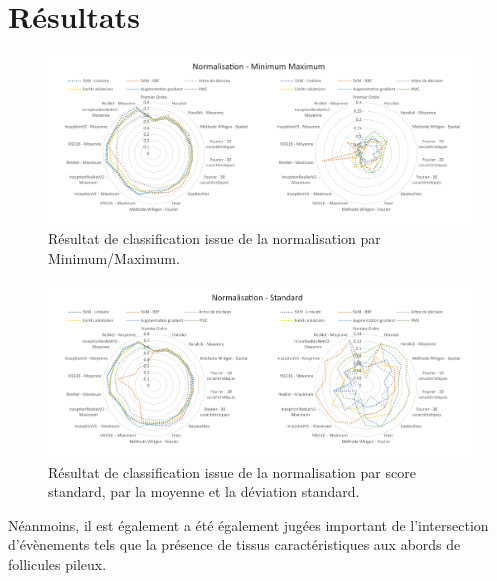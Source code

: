     

\section{Résultats}

\begin{figure}[H]
    \centering
    \includegraphics[width=\linewidth]{contents/chapter_4/resources/results_image_classification_mms.pdf}
    \caption{Résultat de classification issue de la normalisation par Minimum/Maximum.}
    \label{fig:results_image_classification_mms}
\end{figure}\par

\begin{figure}[H]
    \centering
    \includegraphics[width=\linewidth]{contents/chapter_4/resources/results_image_classification_ss.pdf}
    \caption{Résultat de classification issue de la normalisation par score standard, par la moyenne et la déviation standard.}
    \label{fig:results_image_classification_ss}
\end{figure}\par

Néanmoins, il est également a été également jugées important de l'intersection d'évènements tels que la présence de tissus caractéristiques aux abords de follicules pileux.\par
